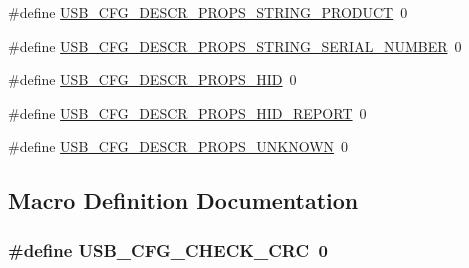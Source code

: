 \begin{DoxyCompactItemize}
\#define \hyperlink{mhvlib-_vusb-_keyboard_2vusb_2usbconfig-prototype_8h_aa08084f9755a643e02d469b66b129ef6}{U\-S\-B\-\_\-\-C\-F\-G\-\_\-\-D\-E\-S\-C\-R\-\_\-\-P\-R\-O\-P\-S\-\_\-\-S\-T\-R\-I\-N\-G\-\_\-\-P\-R\-O\-D\-U\-C\-T}~0
\item 
\#define \hyperlink{mhvlib-_vusb-_keyboard_2vusb_2usbconfig-prototype_8h_a82224c07d3a1f9fcccbff70b71c8ea51}{U\-S\-B\-\_\-\-C\-F\-G\-\_\-\-D\-E\-S\-C\-R\-\_\-\-P\-R\-O\-P\-S\-\_\-\-S\-T\-R\-I\-N\-G\-\_\-\-S\-E\-R\-I\-A\-L\-\_\-\-N\-U\-M\-B\-E\-R}~0
\item 
\#define \hyperlink{mhvlib-_vusb-_keyboard_2vusb_2usbconfig-prototype_8h_adfbd53b5310c36b1e4b06d6a3b992e8a}{U\-S\-B\-\_\-\-C\-F\-G\-\_\-\-D\-E\-S\-C\-R\-\_\-\-P\-R\-O\-P\-S\-\_\-\-H\-I\-D}~0
\item 
\#define \hyperlink{mhvlib-_vusb-_keyboard_2vusb_2usbconfig-prototype_8h_a248eae427d6cea0046661eb8438b7198}{U\-S\-B\-\_\-\-C\-F\-G\-\_\-\-D\-E\-S\-C\-R\-\_\-\-P\-R\-O\-P\-S\-\_\-\-H\-I\-D\-\_\-\-R\-E\-P\-O\-R\-T}~0
\item 
\#define \hyperlink{mhvlib-_vusb-_keyboard_2vusb_2usbconfig-prototype_8h_a3c9ed2d932cf0f5fc9788a91028a8b4b}{U\-S\-B\-\_\-\-C\-F\-G\-\_\-\-D\-E\-S\-C\-R\-\_\-\-P\-R\-O\-P\-S\-\_\-\-U\-N\-K\-N\-O\-W\-N}~0
\end{DoxyCompactItemize}


\subsection{Macro Definition Documentation}
\hypertarget{mhvlib-_vusb-_keyboard_2vusb_2usbconfig-prototype_8h_a57122aa75d9b598adcd238aee5f2b4b7}{
\subsubsection[{U\-S\-B\-\_\-\-C\-F\-G\-\_\-\-C\-H\-E\-C\-K\-\_\-\-C\-R\-C}]{\setlength{\rightskip}{0pt plus 5cm}\#define U\-S\-B\-\_\-\-C\-F\-G\-\_\-\-C\-H\-E\-C\-K\-\_\-\-C\-R\-C~0}}\label{mhvlib-_vusb-_keyboard_2vusb_2usbconfig-prototype_8h_a57122aa75d9b598adcd238aee5f2b4b7}


